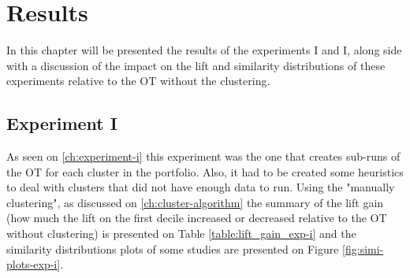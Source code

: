 \chapter{Results}

In this chapter will be presented the results of the experiments I and I, along side with a discussion of the impact on the lift and similarity distributions of these experiments relative to the OT without the clustering.

\section{Experiment I}

As seen on \ref{ch:experiment-i} this experiment was the one that creates sub-runs of the OT for each cluster in the portfolio. Also, it had to be created some heuristics to deal with clusters that did not have enough data to run. Using the "manually clustering", as discussed on \ref{ch:cluster-algorithm} the summary of the lift gain (how much the lift on the first decile increased or decreased relative to the OT without clustering) is presented on Table \ref{table:lift_gain_exp-i} and the similarity distributions plots of some studies are presented on Figure \ref{fig:simi-plots-exp-i}.

